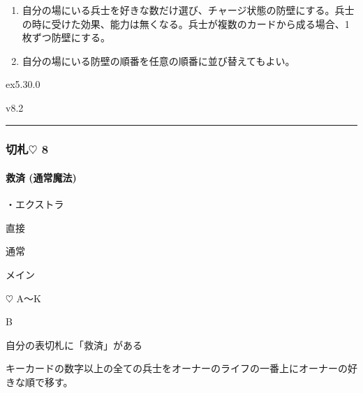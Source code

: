 \documentclass[letterpaper,10pt,dvipdfmx]{sphinxmanual}
\begin{document}
\sphinxAtStartPar
{}
\begin{enumerate}
%
\item {} 
\sphinxAtStartPar
自分の場にいる兵士を好きな数だけ選び、チャージ状態の防壁にする。兵士の時に受けた効果、能力は無くなる。兵士が複数のカードから成る場合、1枚ずつ防壁にする。

\item {} 
\sphinxAtStartPar
自分の場にいる防壁の順番を任意の順番に並び替えてもよい。

\end{enumerate}

\sphinxAtStartPar
{}  ex5.30.0

\sphinxAtStartPar
{}  v8.2


\bigskip\hrule\bigskip



\subsubsection{切札{\normalsize $\heartsuit$} 8}
\label{\detokenize{auto/frameActionlist:id42}}

\paragraph{救済 (通常魔法)}
\label{\detokenize{auto/frameActionlist:act-salvation}}\label{\detokenize{auto/frameActionlist:id43}}
\sphinxAtStartPar
{}

\sphinxAtStartPar
・エクストラ

\sphinxAtStartPar
{} 直接

\sphinxAtStartPar
{} 通常

\sphinxAtStartPar
{} メイン

\sphinxAtStartPar
{} {\normalsize $\heartsuit$} A〜K

\sphinxAtStartPar
{} B

\sphinxAtStartPar
{}

\sphinxAtStartPar
自分の表切札に「救済」がある

\sphinxAtStartPar
{}

\sphinxAtStartPar
キーカードの数字以上の全ての兵士をオーナーのライフの一番上にオーナーの好きな順で移す。
\end{document}
